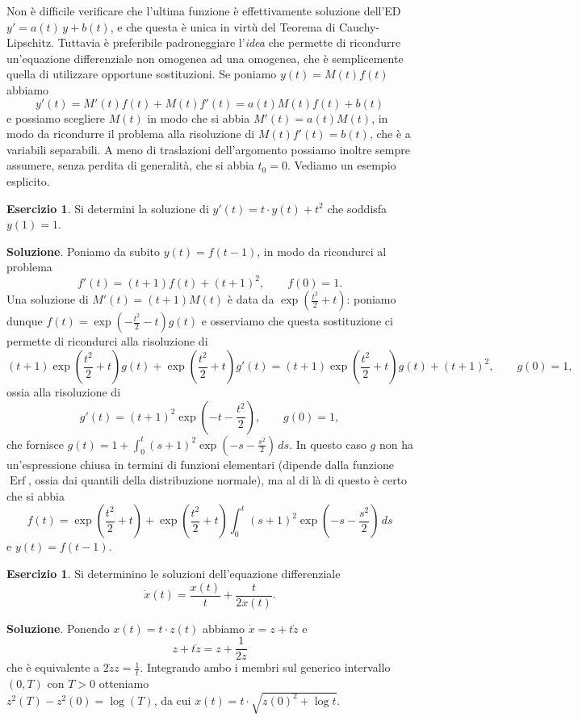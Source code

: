 \documentclass[a4paper,twoside]{article}
\theoremstyle{definition}
\newtheorem{ex}[theorem]{Esercizio}
\numberwithin{theorem}{section}
\begin{document}
Non è difficile verificare che l'ultima funzione è effettivamente soluzione dell'ED $y'=a(t)\,y+b(t)$, e che questa è unica in virtù del Teorema di Cauchy-Lipschitz. Tuttavia è preferibile padroneggiare l'\emph{idea} che permette di ricondurre un'equazione differenziale non omogenea ad una omogenea, che è semplicemente quella di utilizzare opportune sostituzioni. Se poniamo $y(t)=M(t)f(t)$ abbiamo 
$$y'(t)=M'(t)f(t)+M(t)f'(t)=a(t)M(t)f(t)+b(t)$$
e possiamo scegliere $M(t)$ in modo che si abbia $M'(t)=a(t)M(t)$, in modo da ricondurre il problema alla risoluzione di $M(t)f'(t)=b(t)$, che è a variabili separabili. A meno di traslazioni dell'argomento possiamo inoltre sempre assumere, senza perdita di generalità, che si abbia $t_0=0$. Vediamo un esempio esplicito.
\begin{ex} Si determini la soluzione di $y'(t) = t\cdot y(t)+t^2$ che soddisfa $y(1)=1$. 
\end{ex}
\textbf{Soluzione}. Poniamo da subito $y(t)=f(t-1)$, in modo da ricondurci al problema 
$$ f'(t) = (t+1) f(t)+(t+1)^2,\qquad f(0)=1.$$
Una soluzione di $M'(t)=(t+1)M(t)$ è data da $\exp\left(\frac{t^2}{2}+t\right)$: poniamo dunque $f(t)=\exp\left(-\frac{t^2}{2}-t\right)g(t)$ e osserviamo che questa sostituzione ci permette di ricondurci alla risoluzione di 
$$ (t+1)\exp\left(\frac{t^2}{2}+t\right)g(t) + \exp\left(\frac{t^2}{2}+t\right)g'(t) = (t+1)\exp\left(\frac{t^2}{2}+t\right)g(t)+(t+1)^2,\qquad g(0)=1,$$
ossia alla risoluzione di 
$$  g'(t) = (t+1)^2 \exp\left(-t-\frac{t^2}{2}\right),\qquad g(0)=1,$$
che fornisce $g(t)=1+\int_{0}^{t}(s+1)^2 \exp\left(-s-\frac{s^2}{2}\right)\,ds$. In questo caso $g$ non ha un'espressione chiusa in termini di funzioni elementari (dipende dalla funzione $\operatorname{Erf}$, ossia dai quantili della distribuzione normale), ma al di là di questo è certo che si abbia 
$$f(t) = \exp\left(\frac{t^2}{2}+t\right)+\exp\left(\frac{t^2}{2}+t\right)\int_{0}^{t}(s+1)^2 \exp\left(-s-\frac{s^2}{2}\right)\,ds$$
e $y(t)=f(t-1)$.

\begin{ex} Si determinino le soluzioni dell'equazione differenziale 
$$ \dot{x}(t) = \frac{x(t)}{t}+\frac{t}{2x(t)}.$$
\end{ex}
\textbf{Soluzione}. Ponendo $x(t) = t\cdot z(t)$ abbiamo $\dot{x} = z+t\dot{z}$ e 
$$ z + t\dot{z} = z+\frac{1}{2z} $$
che è equivalente a $2\dot{z}z = \frac{1}{t}$. Integrando ambo i membri sul generico intervallo $(0,T)$ con $T>0$ otteniamo\\ $z^2(T)-z^2(0)=\log(T)$, da cui $x(t)=t\cdot \sqrt{z(0)^2+\log t}$.
\end{document}
